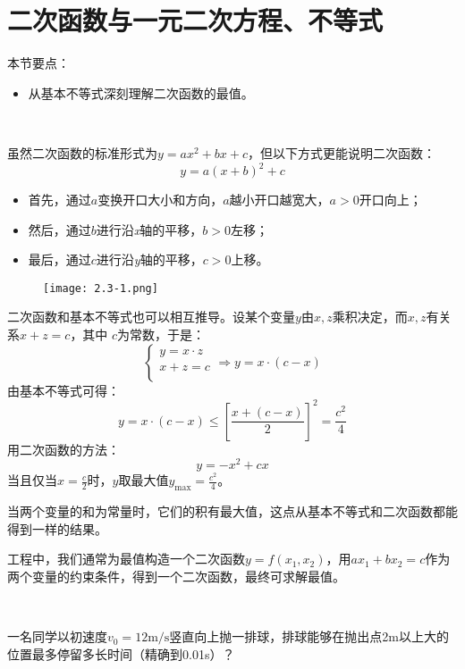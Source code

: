 \section{二次函数与一元二次方程、不等式}

本节要点：
\begin{itemize}
    \item 从基本不等式深刻理解二次函数的最值。
\end{itemize}

~

虽然二次函数的标准形式为$y=ax^2+bx+c$，但以下方式更能说明二次函数：
\[
y=a\left( x+b \right) ^2+c
\]
\begin{itemize}
    \item 首先，通过$a$变换开口大小和方向，$a$越小开口越宽大，$a>0$开口向上；
    \item 然后，通过$b$进行沿{\it x}轴的平移，$b>0$左移；
    \item 最后，通过$c$进行沿{\it y}轴的平移，$c>0$上移。
\end{itemize}

\begin{figure}[h]
\centering
\texttt{[image: 2.3-1.png]}
\end{figure}

二次函数和基本不等式也可以相互推导。设某个变量$y$由$x,z$乘积决定，而$x,z$有关系$x+z=c$，其中 $c$为常数，于是：
\[
\begin{cases}
	y=x\cdot z\\
	x+z=c\\
\end{cases}\Rightarrow y=x\cdot \left( c-x \right)
\]
由基本不等式可得：
\[
y=x\cdot \left( c-x \right) \leqslant \left[ \frac{x+\left( c-x \right)}{2} \right] ^2=\frac{c^2}{4}
\]
用二次函数的方法：
\[
y=-x^2+cx
\]
当且仅当$x=\frac{c}{2}$时，$y$取最大值$y_{\max}=\frac{c^2}{4}$。

\begin{tcolorbox}
当两个变量的和为常量时，它们的积有最大值，这点从基本不等式和二次函数都能得到一样的结果。
\end{tcolorbox}

\begin{tcolorbox}
工程中，我们通常为最值构造一个二次函数$y=f\left( x_1,x_2 \right) $，用$ax_1+bx_2=c$作为两个变量的约束条件，得到一个二次函数，最终可求解最值。
\end{tcolorbox}

~

\begin{example}
一名同学以初速度$v_0=12\mathrm{m}/\mathrm{s}$竖直向上抛一排球，排球能够在抛出点2m以上大的位置最多停留多长时间（精确到0.01s）？
\end{example}

